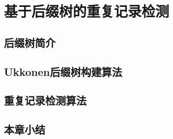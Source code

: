 
\chapter{基于后缀树的重复记录检测}
\label{chap:suffixtree}

\section{后缀树简介}
\label{sec:suffixtreeintro}

\section{Ukkonen后缀树构建算法}
\label{sec:ukkonen}

\section{重复记录检测算法}
\label{sec:multipldetect}

\section{本章小结}
\label{sec:summarysuffixtree}



